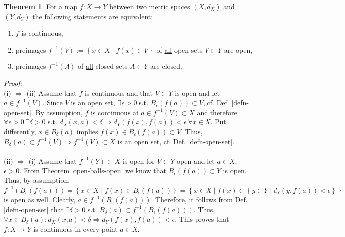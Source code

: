 \documentclass[12pt, a4paper]{article}
\numberwithin{equation}{section}
\theoremstyle{definition}
\theoremstyle{definition}
\newtheorem{theorem}[thm]{Theorem}
\begin{document}
	\begin{theorem}\label{preimages_continuous_functions}
		For a map $f: X\rightarrow Y$ between two metric spaces $\left(X, d_{X} \right)$ and $\left(Y, d_{Y} \right)$ the following statements are equivalent: 
		\begin{enumerate}[label = (\roman*)]
			\item $f$ is continuous,
			\item preimages $f^{-1}(V) := \left\{ x\in X\mid f\left(x\right) \in V \right\}$ of \underline{all} open sets $V\subset Y$ are open,  
			\item preimages $f^{-1}(A)$ of \underline{all} closed sets $A\subset Y$ are closed. 	
		\end{enumerate}
	\end{theorem} 
	\noindent\textit{Proof:} \\ (i) $\Rightarrow$ (ii) Assume that $f$ is continuous and that $V\subset Y$ is open and let $a\in f^{-1}\left( V\right)$. Since $V$ is an open set, $\exists \epsilon > 0$ s.t. $B_{\epsilon}\left( f\left(a\right) \right)\subset V$, cf. Def. \ref{defn-open-set}. By assumption, $f$ is continuous at $a\in f^{-1}\left(V\right)\subset X$ and therefore $\forall \epsilon > 0 \ \exists \delta > 0$ s.t. $d_{X}\left(x, a\right) < \delta\Rightarrow d_{Y}\left(f\left(x\right), f\left(a\right)\right) < \epsilon \ \forall x\in X$. Put differently, $x\in B_{\delta}\left( a\right)$ implies $f\left(x\right) \in B_{\epsilon}\left( f\left(a\right) \right) \subset V$. Thus, $B_{\delta}(a) \subset f^{-1}(V) \Rightarrow f^{-1}(V) \subset X$ is an open set, cf. Def. \ref{defn-open-set}. 
	\\ 
	\\ 
	(ii) $\Rightarrow$ (i) Assume that $f^{-1}\left(Y\right) \subset X$ is open for $V\subset Y$ open and let $a\in X$, $\epsilon > 0$. From Theorem \ref{open-balls-open} we know that $B_{\epsilon}\left(f\left(a\right)\right)\subset Y$ is open. Thus, by assumption, $f^{-1}\left( B_{\epsilon}\left( f\left(a\right) \right) \right) = \left\{ x\in X \mid f\left( x \right) \in B_{\epsilon}\left( f\left(a\right) \right) \right\} = \left\{ x\in X \mid f\left(x\right) \in \left\{ y\in Y\mid d_Y\left( y, f\left(a\right) \right) < \epsilon \right\}\right\}$ is open as well. Clearly, $a\in f^{-1}\left( B_{\epsilon}\left( f\left(a\right) \right) \right)$. Therefore, it follows from Def. \ref{defn-open-set} that $\exists\delta > 0$ s.t. $B_{\delta}(a) \subset f^{-1}\left( B_{\epsilon}\left( f\left(a\right) \right) \right)$. Thus, $\forall x\in B_{\delta}(a): d_{X}\left( x, a \right) < \delta \Rightarrow d_Y\left(f\left(x\right), f\left(a\right)\right) < \epsilon$. This proves that $f: X\rightarrow Y$ is continuous in every point $a\in X$. \cite{cont-functions-open-sets}   
\end{document}
